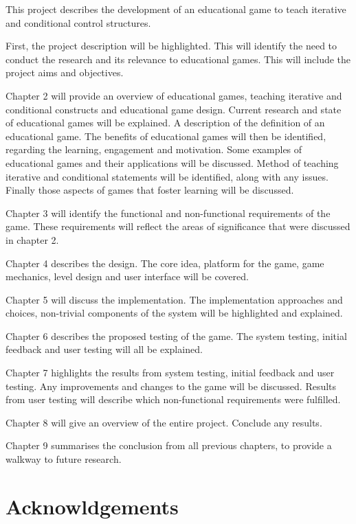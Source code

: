 \documentclass[a4paper,11.5pt]{report}
\numberwithin{figure}{section}
\numberwithin{table}{section}
\numberwithin{equation}{section}
\numberwithin{equation}{section}
\begin{document}
This project describes the development of an educational game to teach iterative and conditional control structures.

First, the project description will be highlighted. This will identify the need to conduct the research and its relevance to educational games. This will include the project aims and objectives.

Chapter 2 will provide an overview of educational games, teaching iterative and conditional constructs and educational game design. Current research and state of educational games will be explained. A description of the definition of an educational game. The benefits of educational games will then be identified, regarding the learning, engagement and motivation. Some examples of educational games and their applications will be discussed. Method of teaching iterative and conditional statements will be identified, along with any issues. Finally those aspects of games that foster learning will be discussed.

Chapter 3 will identify the functional and non-functional requirements of the game. These requirements will reflect the areas of significance that were discussed in chapter 2.

Chapter 4 describes the design. The core idea, platform for the game, game mechanics, level design and user interface will be covered. 

Chapter 5 will discuss the implementation. The implementation approaches and choices, non-trivial components of the system will be highlighted and explained.

Chapter 6 describes the proposed testing of the game. The system testing, initial feedback and user testing will all be explained.  

Chapter 7 highlights the results from system testing, initial feedback and user testing. Any improvements and changes to the game will be discussed. Results from user testing will describe which non-functional requirements were fulfilled.

Chapter 8 will give an overview of the entire project. Conclude any results. 

Chapter 9 summarises the conclusion from all previous chapters, to provide a walkway to future research.

\newpage
\hfill
\section*{\Huge{Acknowldgements}}
\end{document}
